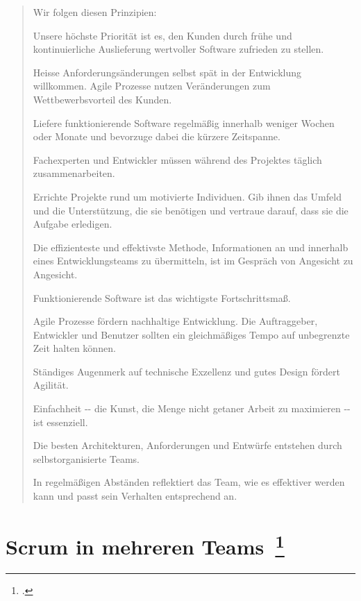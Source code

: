 \begin{quote}Wir folgen diesen Prinzipien:

Unsere höchste Priorität ist es, den Kunden durch frühe und kontinuierliche Auslieferung wertvoller Software zufrieden zu stellen.

Heisse Anforderungsänderungen selbst spät in der Entwicklung willkommen. Agile Prozesse nutzen Veränderungen zum Wettbewerbsvorteil des Kunden.

Liefere funktionierende Software regelmäßig innerhalb weniger Wochen oder Monate und bevorzuge dabei die kürzere Zeitspanne.

Fachexperten und Entwickler müssen während des Projektes täglich zusammenarbeiten.

Errichte Projekte rund um motivierte Individuen. Gib ihnen das Umfeld und die Unterstützung, die sie benötigen und vertraue darauf, dass sie die Aufgabe erledigen.

Die effizienteste und effektivste Methode, Informationen an und innerhalb eines Entwicklungsteams zu übermitteln, ist im Gespräch von Angesicht zu Angesicht.

Funktionierende Software ist das wichtigste Fortschrittsmaß.

Agile Prozesse fördern nachhaltige Entwicklung. Die Auftraggeber, Entwickler und Benutzer sollten ein gleichmäßiges Tempo auf unbegrenzte Zeit halten können.

Ständiges Augenmerk auf technische Exzellenz und gutes Design fördert Agilität.

Einfachheit -\phantom{}- die Kunst, die Menge nicht getaner Arbeit zu maximieren -\phantom{}- ist essenziell.

Die besten Architekturen, Anforderungen und Entwürfe entstehen durch selbstorganisierte Teams.

In regelmäßigen Abständen reflektiert das Team, wie es effektiver werden kann und passt sein Verhalten entsprechend an.\end{quote}\cite{agile_principles}

\section[Scrum in mehreren Teams]{Scrum in mehreren Teams~\footcite[vgl.][S.172ff]{scrum_kurz_gut_2013}}

